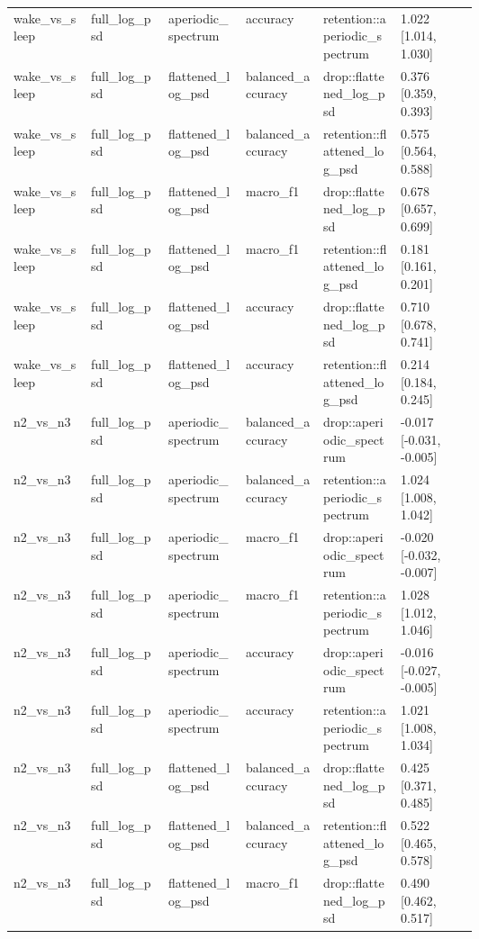 \begin{longtable}{p{0.10\linewidth}p{0.10\linewidth}p{0.10\linewidth}p{0.10\linewidth}p{0.10\linewidth}p{0.10\linewidth}}
wake\_vs\_sleep & full\_log\_psd & aperiodic\_spectrum & accuracy & retention::aperiodic\_spectrum & 1.022 [1.014, 1.030]\\
wake\_vs\_sleep & full\_log\_psd & flattened\_log\_psd & balanced\_accuracy & drop::flattened\_log\_psd & 0.376 [0.359, 0.393]\\
wake\_vs\_sleep & full\_log\_psd & flattened\_log\_psd & balanced\_accuracy & retention::flattened\_log\_psd & 0.575 [0.564, 0.588]\\
wake\_vs\_sleep & full\_log\_psd & flattened\_log\_psd & macro\_f1 & drop::flattened\_log\_psd & 0.678 [0.657, 0.699]\\
wake\_vs\_sleep & full\_log\_psd & flattened\_log\_psd & macro\_f1 & retention::flattened\_log\_psd & 0.181 [0.161, 0.201]\\
wake\_vs\_sleep & full\_log\_psd & flattened\_log\_psd & accuracy & drop::flattened\_log\_psd & 0.710 [0.678, 0.741]\\
wake\_vs\_sleep & full\_log\_psd & flattened\_log\_psd & accuracy & retention::flattened\_log\_psd & 0.214 [0.184, 0.245]\\
n2\_vs\_n3 & full\_log\_psd & aperiodic\_spectrum & balanced\_accuracy & drop::aperiodic\_spectrum & -0.017 [-0.031, -0.005]\\
n2\_vs\_n3 & full\_log\_psd & aperiodic\_spectrum & balanced\_accuracy & retention::aperiodic\_spectrum & 1.024 [1.008, 1.042]\\
n2\_vs\_n3 & full\_log\_psd & aperiodic\_spectrum & macro\_f1 & drop::aperiodic\_spectrum & -0.020 [-0.032, -0.007]\\
n2\_vs\_n3 & full\_log\_psd & aperiodic\_spectrum & macro\_f1 & retention::aperiodic\_spectrum & 1.028 [1.012, 1.046]\\
n2\_vs\_n3 & full\_log\_psd & aperiodic\_spectrum & accuracy & drop::aperiodic\_spectrum & -0.016 [-0.027, -0.005]\\
n2\_vs\_n3 & full\_log\_psd & aperiodic\_spectrum & accuracy & retention::aperiodic\_spectrum & 1.021 [1.008, 1.034]\\
n2\_vs\_n3 & full\_log\_psd & flattened\_log\_psd & balanced\_accuracy & drop::flattened\_log\_psd & 0.425 [0.371, 0.485]\\
n2\_vs\_n3 & full\_log\_psd & flattened\_log\_psd & balanced\_accuracy & retention::flattened\_log\_psd & 0.522 [0.465, 0.578]\\
n2\_vs\_n3 & full\_log\_psd & flattened\_log\_psd & macro\_f1 & drop::flattened\_log\_psd & 0.490 [0.462, 0.517]\\

\end{longtable}

